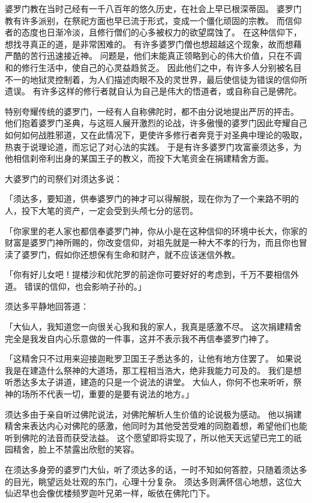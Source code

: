 \documentclass[twoside,openany]{book}
\begin{document}
婆罗门教在当时己经有一千八百年的悠久历史，在社会上早已根深蒂固。
婆罗门教有许多派别，在祭祀方面也早已流于形式，变成一个僵化顽固的宗教。
而信仰者的态度也日渐冷淡，且修行僧们的心多被权力的欲望腐蚀了。
在这种信仰下，想找寻真正的道，是非常困难的。
有许多婆罗门僧也想超越这个现象，故而想藉严酷的苦行迅速接近神。
问题是，他们未能真正领略到心的伟大价值，只在不调和的修行生活中，使自己的心灵益趋贫乏。
因此他们之中，有许多人分别被名目不一的地狱灵控制着，为人们描述肉眼不及的灵世界，最后使信徒为错误的信仰所遗误。
有许多这样的修行者就自认为自己是伟大的悟道者，或自称自己是佛陀。

特别夸耀传统的婆罗门，一经有人自称佛陀时，都不由分说地提出严厉的抨击。
他们抱着婆罗门圣典，与这班人展开激烈的论战，许多傲慢的婆罗门因此夸耀自己如何如何战胜邪道，又在此情况下，更使许多修行者奔竞于对圣典中理论的吸取，热衷于说理论道，而忘记了对心法的实践。
于是有许多婆罗门攻富豪须达多，为他相信刹帝利出身的某国王子的教义，而投下大笔资金在捐建精舍方面。

大婆罗门的司祭们对须达多说：

「须达多，要知道，供奉婆罗门的神才可以得解脱，现在你为了一个来路不明的人，投下大笔的资产，一定会受到头颅七分的惩罚。

「你家里的老人家也都信奉婆罗门神，你从小是在这种信仰的环境中长大，你家的财富是婆罗门神所赐的，你改变信仰，对祖先就是一种大不孝的行为，而且你也冒渎了婆罗门，假如你还想保有生命和财产，就不应该迷信外教。

「你有好儿女吧！提楼沙和优陀罗的前途你可要好好的考虑到，千万不要相信外道。
错误的信仰，也会影响子孙的。」

须达多平静地回答道：

「大仙人，我知道您一向很关心我和我的家人，我真是感激不尽。
这次捐建精舍完全是我发自内心乐意做的一件事，这并不表示我不再信奉婆罗门神了。

「这精舍只不过用来迎接迦毗罗卫国王子悉达多的，让他有地方住罢了。
如果说我是在建造什么祭神的大道场，那工程相当浩大，绝非我能力可及的。
我们是想听悉达多太子讲道，建造的只是一个说法的讲堂。
大仙人，你何不也来听听，祭神的场所不代表一切，重要的是要有说法的地方。」

须达多由于亲自听过佛陀说法，对佛陀解析人生价值的论说极为感动。
他以捐建精舍来表达内心对佛陀的感激，他同时为其他受苦受难的同胞着想，希望他们也能听到佛陀的法音而获受法益。
这个愿望即将实现了，所以他天天远望已完工的祇园精舍，脸上不禁露出欣慰的笑容。

在须达多身旁的婆罗门大仙，听了须达多的话，一时不知如何答腔，只随着须达多的目光，眺望远处壮观的东门，心理十分复杂。
须达多则满怀信心地想，这位大仙迟早也会像优楼频罗迦叶兄弟一样，皈依在佛陀门下。
\end{document}
